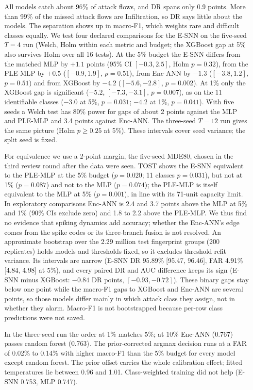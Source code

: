 \documentclass[conference]{IEEEtran}
\begin{document}
All models catch about 96\% of attack flows, and DR spans only 0.9 points. More than 99\% of the missed attack flows are Infiltration, so DR says little about the models. The separation shows up in macro-F1, which weights rare and difficult classes equally. We test four declared comparisons for the E-SNN on the five-seed $T = 4$ run (Welch, Holm within each metric and budget; the XGBoost gap at 5\% also survives Holm over all 16 tests). At the 5\% budget the E-SNN differs from the matched MLP by $+1.1$ points (95\% CI $[-0.3, 2.5]$, Holm $p = 0.32$), from the PLE-MLP by $+0.5$ ($[-0.9, 1.9]$, $p = 0.51$), from Enc-ANN by $-1.3$ ($[-3.8, 1.2]$, $p = 0.51$) and from XGBoost by $-4.2$ ($[-5.6, -2.8]$, $p = 0.002$). At 1\% only the XGBoost gap is significant ($-5.2$, $[-7.3, -3.1]$, $p = 0.007$), as on the 11 identifiable classes ($-3.0$ at 5\%, $p = 0.031$; $-4.2$ at 1\%, $p = 0.041$). With five seeds a Welch test has 80\% power for gaps of about 2 points against the MLP and PLE-MLP and 3.4 points against Enc-ANN. The three-seed $T = 12$ run gives the same picture (Holm $p \geq 0.25$ at 5\%). These intervals cover seed variance; the split seed is fixed.

For equivalence we use a 2-point margin, the five-seed MDE80, chosen in the third review round after the data were seen. TOST shows the E-SNN equivalent to the PLE-MLP at the 5\% budget ($p = 0.020$; 11 classes $p = 0.031$), but not at 1\% ($p = 0.087$) and not to the MLP ($p = 0.074$); the PLE-MLP is itself equivalent to the MLP at 5\% ($p = 0.001$), in line with its 71-unit capacity limit. In exploratory comparisons Enc-ANN is 2.4 and 3.7 points above the MLP at 5\% and 1\% (90\% CIs exclude zero) and 1.8 to 2.2 above the PLE-MLP. We thus find no evidence that spiking dynamics add accuracy; whether the Enc-ANN's edge comes from the spike codes or its three-branch fusion is not resolved. An approximate bootstrap over the 2.29 million test fingerprint groups (200 replicates) holds models and thresholds fixed, so it excludes threshold-refit variance. Its intervals are narrow (E-SNN DR 95.89\% [95.47, 96.46], FAR 4.91\% [4.84, 4.98] at 5\%), and every paired DR and AUC difference keeps its sign (E-SNN minus XGBoost: $-0.84$ DR points, $[-0.93, -0.72]$). These binary gaps stay below one point while the macro-F1 gaps to XGBoost and Enc-ANN are several points, so those models differ mainly in which attack class they assign, not in whether they alarm. Macro-F1 is not bootstrapped because per-row class predictions were not saved.

In the three-seed run the order at 1\% matches 5\%; at 10\% Enc-ANN (0.767) passes random forest (0.763). The prior-corrected argmax decision runs at a FAR of 0.02\% to 0.14\% with higher macro-F1 than the 5\% budget for every model except random forest. The prior offset carries the whole calibration effect; fitted temperatures lie between 0.96 and 1.01. Class-weighted training did not help (E-SNN 0.753, MLP 0.747).
\end{document}
